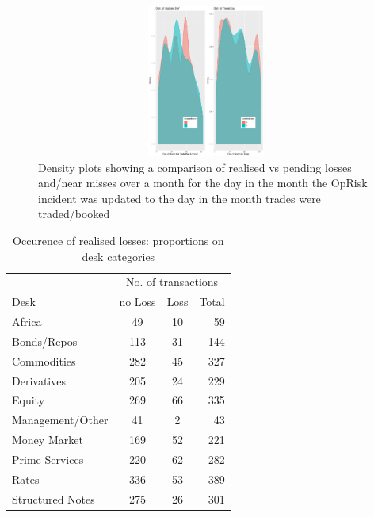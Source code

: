 \documentclass{DissertateUSU}
\begin{document}
\begin{figure}
\centering
\includegraphics[width=15cm,height=5cm]{Density_UpdateDay_TradedDay.pdf}
\caption[Density plots showing a comparison of realised vs pending losses and/near misses over a month for the day in the month the OpRisk incident was updated to the day in the month trades were traded/booked]{Density plots showing a comparison of realised vs pending losses and/near misses over a month for the day in the month the OpRisk incident was updated to the day in the month trades were traded/booked}
\label{Density_Proportions}
\end{figure}

\singlespacing

\doublespacing

\begin{table}[ht]
\centering
\caption{Occurence of realised losses: proportions on desk categories}
\begin{tabular}{lccr}
\toprule
  & \multicolumn{3}{c}{No. of transactions} \\
Desk   & no Loss   & Loss & Total\\ 
\midrule
  Africa            &  49 & 10 &  59 \\
  Bonds/Repos       & 113 & 31 & 144 \\
  Commodities       & 282 & 45 & 327 \\
  Derivatives       & 205 & 24 & 229 \\
  Equity            & 269 & 66 & 335 \\
  Management/Other  &  41 &  2 &  43 \\
  Money Market      & 169 & 52 & 221 \\
  Prime Services    & 220 & 62 & 282 \\
  Rates             & 336 & 53 & 389 \\
  Structured Notes  & 275 & 26 & 301 \\
 \bottomrule
\end{tabular}\label{tab_Desk_Prop}
\end{table}
\end{document}
